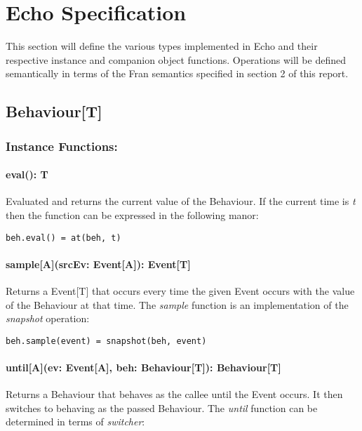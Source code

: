 \chapter{Echo Specification}

  This section will define the various types implemented in Echo and their
  respective instance and companion object functions. Operations will be defined 
  semantically in terms of the Fran semantics specified in section 2 of this report.

  \section*{Behaviour[T]}
    \subsection*{Instance Functions:}
    \subsubsection*{eval(): T}
      Evaluated and returns the current value of the
      Behaviour. If the current time is \emph{t} then the
      function can be expressed in the following manor:

\begin{verbatim}
beh.eval() = at(beh, t)
\end{verbatim}      
    
    \subsubsection*{sample[A](srcEv: Event[A]): Event[T]}
      Returns a Event[T] that occurs every time the given
      Event occurs with the value of the Behaviour at that time.
      The \emph{sample} function is an implementation of the \emph{snapshot} operation:
      
\begin{verbatim}
beh.sample(event) = snapshot(beh, event)
\end{verbatim}
    
    \subsubsection*{until[A](ev: Event[A], beh: Behaviour[T]): Behaviour[T]}
      Returns a Behaviour that behaves as the callee until the
      Event occurs. It then switches to behaving as the passed
      Behaviour. The \emph{until} function can be determined in terms
      of \emph{switcher}:

